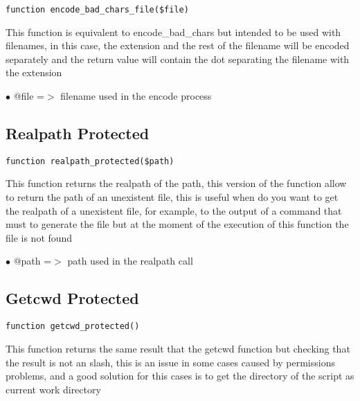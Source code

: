 \documentclass[a4paper]{book}
\begin{document}
\begin{lstlisting}
function encode_bad_chars_file($file)
\end{lstlisting}

This function is equivalent to encode\_bad\_chars but intended to be used
with filenames, in this case, the extension and the rest of the filename
will be encoded separately and the return value will contain the dot
separating the filename with the extension

\begin{compactitem}
\item[\color{myblue}$\bullet$] @file =$>$ filename used in the encode process
\end{compactitem}

\hypertarget{toc136}{}
\subsection{Realpath Protected}

\begin{lstlisting}
function realpath_protected($path)
\end{lstlisting}

This function returns the realpath of the path, this version of the function
allow to return the path of an unexistent file, this is useful when do you
want to get the realpath of a unexistent file, for example, to the output of
a command that must to generate the file but at the moment of the execution
of this function the file is not found

\begin{compactitem}
\item[\color{myblue}$\bullet$] @path =$>$ path used in the realpath call
\end{compactitem}

\hypertarget{toc137}{}
\subsection{Getcwd Protected}

\begin{lstlisting}
function getcwd_protected()
\end{lstlisting}

This function returns the same result that the getcwd function but checking
that the result is not an slash, this is an issue in some cases caused by
permissions problems, and a good solution for this cases is to get the directory
of the script as current work directory
\end{document}
